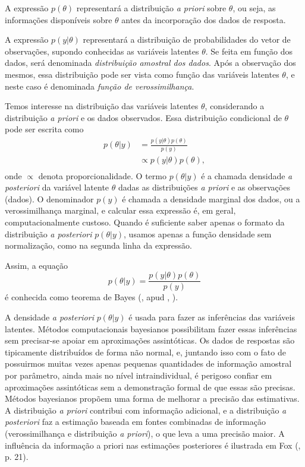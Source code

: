 \documentclass[
	12pt,				%
	openright,			%
	twoside,			%
	a4paper,			%
	english,			%
	brazil				%
	]{abntex2}
\begin{document}
 A expressão $p(\theta)$ representará a distribuição \emph{a priori} sobre $\theta$, ou seja, as informações disponíveis sobre $\theta$ antes da incorporação dos dados de resposta.

 A expressão $p(y|\theta)$ representará a distribuição de probabilidades do vetor de observações, supondo conhecidas as variáveis latentes $\theta$. Se feita em função dos dados, será denominada \emph{distribuição amostral dos dados}. Após a observação dos mesmos, essa distribuição pode ser vista como função das variáveis latentes $\theta$, e neste caso é denominada \emph{função de verossimilhança}.
 
 Temos interesse na distribuição das variáveis latentes $\theta$, considerando a distribuição \emph{a priori} e os dados observados. Essa distribuição condicional de $\theta$ pode ser escrita como
 \begin{equation}
    \begin{aligned}
        p(\theta|y) &= \frac{p(y|\theta) p(\theta)}{p(y)} \\
        & \propto p(y|\theta) p(\theta), \\
     \end{aligned}
 \end{equation}
 onde $\propto$ denota proporcionalidade. O termo $p(\theta|y)$ é a chamada densidade \emph{a posteriori} da variável latente $\theta$ dadas as distribuições \emph{a priori} e as observações (dados). O denominador $p(y)$ é chamada a densidade marginal dos dados, ou a verossimilhança marginal, e calcular essa expressão é, em geral, computacionalmente custoso. Quando é suficiente saber apenas o formato da distribuição \emph{a posteriori} $p(\theta|y)$, usamos apenas a função densidade sem normalização, como na segunda linha da expressão.

 Assim, a equação
 \begin{equation}
    p(\theta|y) = \frac{p(y|\theta) p(\theta)}{p(y)}
 \end{equation}
 é conhecida como teorema de Bayes (\citeyear{bayes1763}, apud , \citeyear{fox2010}).
 
 A densidade \emph{a posteriori} $p(\theta|y)$ é usada para fazer as inferências das variáveis latentes. Métodos computacionais bayesianos possibilitam fazer essas inferências sem precisar-se apoiar em aproximações assintóticas. Os dados de respostas são tipicamente distribuídos de forma não normal, e, juntando isso com o fato de possuirmos muitas vezes apenas pequenas quantidades de informação amostral por parâmetro, ainda mais no nível intraindividual, é perigoso confiar em aproximações assintóticas sem a demonstração formal de que essas são precisas. Métodos bayesianos propõem uma forma de melhorar a precisão das estimativas. A distribuição \emph{a priori} contribui com informação adicional, e a distribuição \emph{a posteriori} faz a estimação baseada em fontes combinadas de informação (verossimilhança e distribuição \emph{a priori}), o que leva a uma precisão maior. A influência da informação a priori nas estimações posteriores é ilustrada em Fox (\citeyear{fox2010}, p. 21).
\end{document}
